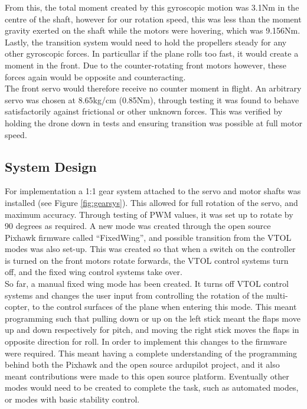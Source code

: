 From this, the total moment created by this gyroscopic motion was 3.1Nm in the centre of the shaft, however for our rotation speed, this was less than the moment gravity exerted on the shaft while the motors were hovering, which was 9.156Nm. Lastly, the transition system would need to hold the propellers steady for any other gyroscopic forces. In particullar if the plane rolls too fast, it would create a moment in the front. Due to the counter-rotating front motors however, these forces again would be opposite and counteracting.\\

The front servo would therefore receive no counter moment in flight. An arbitrary servo was chosen at 8.65kg/cm (0.85Nm), through testing it was found to behave satisfactorily against frictional or other unknown forces. This was verified by holding the drone down in tests and ensuring transition was possible at full motor speed.

\subsection{System Design}
For implementation a 1:1 gear system attached to the servo and motor shafts was installed (see Figure \ref{fig:gearsys}). This allowed for full rotation of the servo, and maximum accuracy.  Through testing of PWM values, it was set up to rotate by 90 degrees as required. A new mode was created through the open source Pixhawk firmware called “FixedWing”, and possible transition from the VTOL modes was also set-up. This was created so that when a switch on the controller is turned on the front motors rotate forwards, the VTOL control systems turn off, and the fixed wing control systems take over.\\

So far, a manual fixed wing mode has been created. It turns off VTOL control systems and changes the user input from controlling the rotation of the multi-copter, to the control surfaces of the plane when entering this mode. This meant programming such that pulling down or up on the left stick meant the flaps move up and down respectively for pitch, and moving the right stick moves the flaps in opposite direction for roll.  In order to implement this changes to the firmware were required.  This meant having  a complete understanding of the programming behind both the Pixhawk and the open source ardupilot project, and it also meant contributions were made to this open source platform. Eventually other modes would need to be created to complete the task, such as automated modes, or modes with basic stability control. \\

